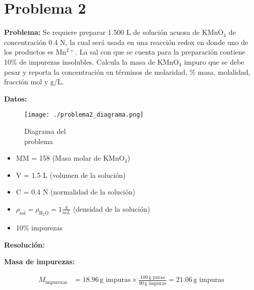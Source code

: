 \documentclass{article}
\begin{document}
\newpage
\section*{Problema 2}
\textbf{Problema:} Se requiere preparar 1.500 L de solución acuosa de KMnO$_4$ de concentración 0.4 N, la cual será usada en una reacción redox en donde uno de los productos es Mn$^{2+}$. La sal con que se cuenta para la preparación contiene 10\% de impurezas insolubles. Calcula la masa de KMnO$_4$ impuro que se debe pesar y reporta la concentración en términos de molaridad, \% masa, molalidad, fracción mol y g/L.

\begin{multicols}{2} %
\noindent\textbf{Datos:} %

\begin{figure}[H]
    \begin{minipage}[t]{0.3\textwidth} %
        \raggedright %
        \texttt{[image: ./problema2\_diagrama.png]} %
        \caption{Diagrama del \\ problema}
    \end{minipage}
\end{figure}

\textbf{} %
\begin{itemize}
\item MM = 158 (Masa molar de KMnO$_4$)
\item V = 1.5 L (volumen de la solución)
\item C = 0.4 N (normalidad de la solución)
\item $\rho_{\text{sol}} = \rho_{\text{H}_2\text{O}} = 1 \frac{g}{mL}$ (densidad de la solución)
\item 10\% impurezas
\end{itemize}

\columnbreak %

\noindent\textbf{Resolución:} %

\textbf{Masa de impurezas:}

\begin{align*}
    M_{\text{impurezas}} &= 18.96 \, \text{g impuras} \times \frac{100 \, \text{g puras}}{90 \, \text{g impuras}} = 21.06 \, \text{g impuras}
\end{align*}


\end{multicols}
\end{document}
